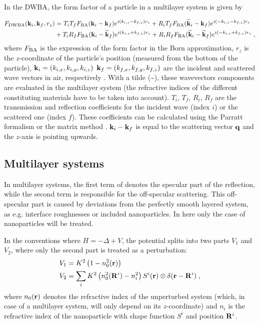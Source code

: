  In the DWBA, the form factor of a particle in a multilayer system is given by

\begin{align}
F_{\rm{DWBA}} (\mathbf{k}_i,\mathbf{k}_f, r_z) & = T_i T_f F_{\rm{BA}} (\mathbf{k}_i-\mathbf{k}_f) e^{i (k_{i,z}-k_{f,z}) r_z} + R_i T_f F_{\rm{BA}}(\mathbf{\widetilde{k}}_i-\mathbf{k}_f) e^{i(-k_{i,z}-k_{f,z})r_z}
 \nonumber \\
  &+ T_i R_f F_{\rm{BA}}(\mathbf{k}_i-\mathbf{\widetilde{k}}_f)e^{i(k_{i,z}+k_{f,z})r_z} + R_iR_fF_{\rm{BA}} (\mathbf{\widetilde{k}}_i-\mathbf{\widetilde{k}}_f)e^{i(-k_{i,z}+k_{f,z})r_z} \; , \label{eq:dwbageneral}
\end{align}
where $F_{\rm{BA}}$ is the expression of the form factor in the Born approximation, $r_z$ is the $z$-coordinate of the particle's position (measured from the bottom of the particle), $\mathbf{k}_i=(k_{i,x}, k_{i,y}, k_{i,z})$ $\mathbf{k}_f=(k_{f,x}, k_{f,y}, k_{f,z})$ are the incident and scattered wave vectors in air, respectively \cite{RaSS95}. With a tilde (\~{}), these wavevectors components are evaluated in the multilayer system (the refractive indices of the different constituting materials have to be taken into account). 
$T_i$, $T_f$, $R_i$, $R_f$ are the transmission and reflection coefficients for the incident wave (index $i$) or the scattered one (index $f$). These coefficients can be calculated using the Parratt formalism \cite{Par54} or the matrix method \cite{BoWo99}. $\mathbf{k}_i-\mathbf{k}_f$ is equal to the scattering vector $\mathbf{q}$ and the $z$-axis is pointing upwards.\\

\subsection{Multilayer systems}

In multilayer systems, the first term of  denotes the specular part of the reflection, while the second term is responsible for the off-specular scattering. This off-specular part is caused by deviations from the perfectly smooth layered system, as e.g. interface roughnesses or included nanoparticles. In here only the case of nanoparticles will be treated.

In the conventions where $H=-\Delta + V$, the potential splits into two parts $V_1$ and $V_2$, where only the second part is treated as a perturbation:
\begin{align*}
  V_1 & = K^2\left( 1-n_0^2(\mathbf{r})\right)  \\
  V_2 & = \sum_i K^2\left( n_0^2(\mathbf{R}^i) - n_i^2 \right) S^i(\mathbf{r}) \otimes \delta(\mathbf{r}-\mathbf{R}^i) \; ,
\end{align*}
where $n_0(\mathbf{r})$ denotes the refractive index of the unperturbed system (which, in case of a multilayer system, will only depend on its $z$-coordinate) and $n_i$ is the refractive index of the nanoparticle with shape function $S^i$ and position $\mathbf{R}^i$.

